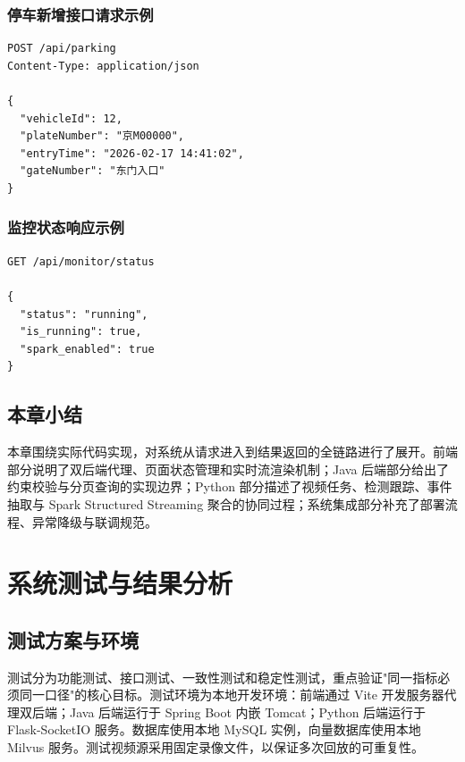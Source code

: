 \documentclass{wzuthesis} %
\begin{document}
\subsection{停车新增接口请求示例}

\begin{lstlisting}[caption={停车新增接口请求示例}]
POST /api/parking
Content-Type: application/json

{
  "vehicleId": 12,
  "plateNumber": "京M00000",
  "entryTime": "2026-02-17 14:41:02",
  "gateNumber": "东门入口"
}
\end{lstlisting}

\subsection{监控状态响应示例}

\begin{lstlisting}[caption={监控状态响应示例}]
GET /api/monitor/status

{
  "status": "running",
  "is_running": true,
  "spark_enabled": true
}
\end{lstlisting}


\section{本章小结}

本章围绕实际代码实现，对系统从请求进入到结果返回的全链路进行了展开。前端部分说明了双后端代理、页面状态管理和实时流渲染机制；Java 后端部分给出了约束校验与分页查询的实现边界；Python 部分描述了视频任务、检测跟踪、事件抽取与 Spark Structured Streaming 聚合的协同过程；系统集成部分补充了部署流程、异常降级与联调规范。

\chapter{系统测试与结果分析}

\section{测试方案与环境}

测试分为功能测试、接口测试、一致性测试和稳定性测试，重点验证"同一指标必须同一口径"的核心目标。测试环境为本地开发环境：前端通过 Vite 开发服务器代理双后端；Java 后端运行于 Spring Boot 内嵌 Tomcat；Python 后端运行于 Flask-SocketIO 服务。数据库使用本地 MySQL 实例，向量数据库使用本地 Milvus 服务。测试视频源采用固定录像文件，以保证多次回放的可重复性。
\end{document}
